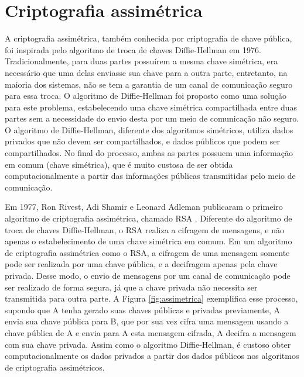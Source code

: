 \section{Criptografia assimétrica}
    A criptografia assimétrica, também conhecida por criptografia de chave pública, foi inspirada pelo algoritmo de troca de chaves Diffie-Hellman em 1976. Tradicionalmente, para duas partes possuírem a mesma chave simétrica, era necessário que uma delas enviasse sua chave para a outra parte, entretanto, na maioria dos sistemas, não se tem a garantia de um canal de comunicação seguro para essa troca. O algoritmo de Diffie-Hellman \cite{diffie-hellman} foi proposto como uma solução para este problema, estabelecendo uma chave simétrica compartilhada entre duas partes sem a necessidade do envio desta por um meio de comunicação não seguro. O algoritmo de Diffie-Hellman, diferente dos algoritmos simétricos, utiliza dados privados que não devem ser compartilhados, e dados públicos que podem ser compartilhados. No final do processo, ambas as partes possuem uma informação em comum (chave simétrica), que é muito custosa de ser obtida computacionalmente a partir das informações públicas transmitidas pelo meio de comunicação. 
    
    Em 1977, Ron Rivest, Adi Shamir e Leonard Adleman publicaram o primeiro algoritmo de criptografia assimétrica, chamado RSA \cite{rsa}. Diferente do algoritmo de troca de chaves Diffie-Hellman, o RSA realiza a cifragem de mensagens, e não apenas o estabelecimento de uma chave simétrica em comum. Em um algoritmo de criptografia assimétrica como o RSA, a cifragem de uma mensagem somente pode ser realizada por uma chave pública, e a decifragem apenas pela chave privada. Desse modo, o envio de mensagens por um canal de comunicação pode ser realizado de forma segura, já que a chave privada não necessita ser transmitida para outra parte. A Figura \ref{fig:assimetrica} exemplifica esse processo, supondo que A tenha gerado suas chaves públicas e privadas previamente, A envia sua chave pública para B, que por sua vez cifra uma mensagem usando a chave pública de A e envia para A esta mensagem cifrada, A decifra a mensagem com sua chave privada. Assim como o algoritmo Diffie-Hellman, é custoso obter computacionalmente os dados privados a partir dos dados públicos nos algoritmos de criptografia assimétricos.

